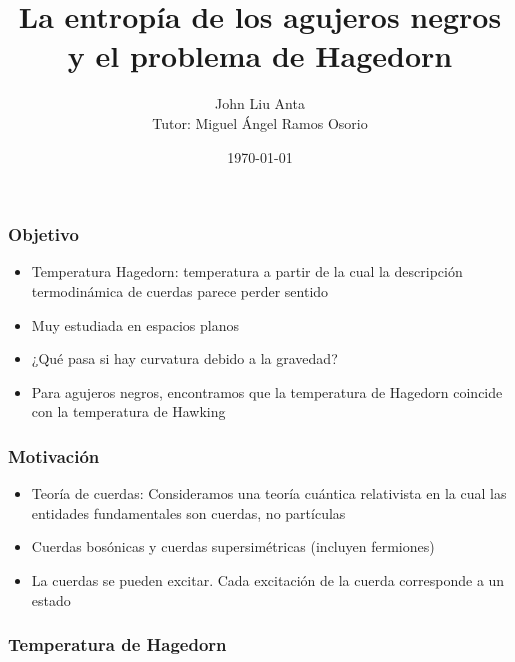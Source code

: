 \documentclass{beamer}
\begin{document}
\title{La entropía de los agujeros negros y el problema de Hagedorn}  
\author{John Liu Anta\\
        Tutor: Miguel Ángel Ramos Osorio}
\date{\today} 
\frame{\titlepage} 

\begin{frame}
  \frametitle{Objetivo}
  \begin{itemize}
    \item Temperatura Hagedorn: temperatura a partir de la cual la descripción termodinámica de cuerdas parece
      perder sentido
    \item  Muy estudiada en espacios planos
    \item  ¿Qué pasa si hay curvatura debido a la gravedad?
    \item Para agujeros negros, encontramos que la temperatura de Hagedorn coincide con la 
      temperatura de Hawking
  \end{itemize}
\end{frame}


\begin{frame}
  \frametitle{Motivación}
  \begin{itemize}
    \item     Teoría de cuerdas: Consideramos una teoría cuántica relativista en la cual las entidades fundamentales
      son cuerdas, no partículas
    \item Cuerdas bosónicas y cuerdas supersimétricas (incluyen fermiones)
    \item  La cuerdas se pueden excitar. Cada excitación de la cuerda corresponde a un estado
  \end{itemize}

\end{frame}

\begin{frame}
  \frametitle{Temperatura de Hagedorn}
\end{frame}
\end{document}
